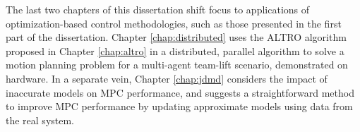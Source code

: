 \documentclass[../root.tex]{subfiles}
\begin{document}
The last two chapters of this dissertation shift focus to applications of optimization-based
control methodologies, such as those presented in the first part of the dissertation. 
Chapter \ref{chap:distributed} uses the ALTRO algorithm proposed in Chapter \ref{chap:altro}
in a distributed, parallel algorithm to solve a motion planning problem for a multi-agent 
team-lift scenario, demonstrated on hardware. 
In a separate vein, Chapter \ref{chap:jdmd} considers the impact of inaccurate models on 
MPC performance, and suggests a straightforward method to improve MPC performance by 
updating approximate models using data from the real system.


\end{document}
